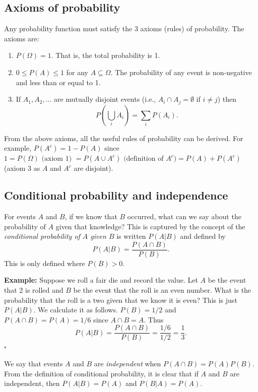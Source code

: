 \documentclass[11pt]{article}
\newcommand{\sqend}{\hfill $\square$}
\begin{document}
\subsection{Axioms of probability}


Any probability function must satisfy the 3 axioms (rules) of probability.  The axioms are:
\begin{enumerate}
\item $P(\Omega) = 1$.  That is, the total probability is 1.

\item $0 \leq P(A) \leq 1$ for any $A \subseteq \Omega$.   The probability of any event  is non-negative and less than or equal to 1.

\item If $A_1, A_2, \ldots$ are mutually disjoint events (i.e., $A_i \cap A_j = \emptyset$ if $i \neq j$) then 
\[ P\left( \bigcup_i A_i \right) = \sum_i P(A_i).
\]
\end{enumerate}
From the above axioms, all the useful rules of probability can be derived.  For example, $P(A^c) = 1 - P(A)$ since $1 =  P(\Omega) \mbox{ (axiom 1) }= P(A \cup A^c) \mbox{ (definition of }A^c) = P(A) + P( A^c) $ (axiom 3 as $A$ and $A^c$ are disjoint). 

\subsection{Conditional probability and independence}

For events $A$ and $B$, if we know that $B$ occurred, what can we say about the probability of $A$ given that knowledge?  This is captured by  the  concept of the {\em conditional probability of $A$ given $B$} is written $P(A|B)$ and defined by
\[ P(A|B) = \frac {P(A \cap B)}{P(B)}. \]
This is only defined where $P(B)>0$.  

{\bf Example:} Suppose we roll a fair die and record the value.  Let $A$ be the event that 2 is rolled and $B$ be the event that the roll is an even number. What is the probability that the roll is a two given that we know it is even?  This is just $P(A|B)$.  We calculate it as follows. $P(B) = 1/2$ and $P(A \cap B) = P(A) = 1/6$ since $A \cap B = A$.  Thus 
\[ P(A|B) =  \frac {P(A \cap B)}{P(B)} = \frac{1/6}{1/2} = \frac 1 3. \]\sqend   



We say that events $A$ and $B$ are {\em  independent} when $P(A \cap B) = P(A)P(B)$.  From the definition of conditional probability, it is clear that if $A$ and $B$ are independent, then $P(A|B) = P(A)$ and $P(B|A) = P(A)$.
\end{document}
